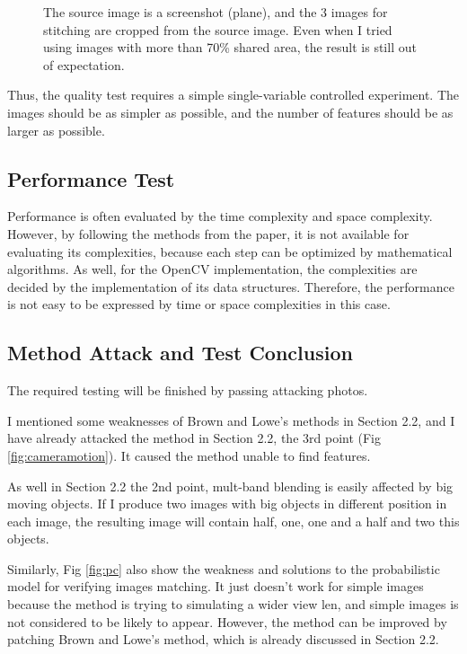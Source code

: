 \documentclass[10pt,twocolumn,letterpaper]{article}
\begin{document}
\begin{figure}[t]
\begin{center}
    \end{center}
    \caption{The source image is a screenshot (plane), and the 3 images for stitching are cropped from the source image.
    Even when I tried using images with more than 70\% shared area, the result is still out of expectation.}
    \label{fig:fail}
\end{figure}

Thus, the quality test requires a simple single-variable controlled experiment.
The images should be as simpler as possible, and the number of features should be as larger as possible.

\subsection{Performance Test}
Performance is often evaluated by the time complexity and space complexity.
However, by following the methods from the paper, it is not available for evaluating its complexities,
because each step can be optimized by mathematical algorithms. 
As well, for the OpenCV implementation, the complexities are decided by the implementation of its data structures.
Therefore, the performance is not easy to be expressed by time or space complexities in this case.

\subsection{Method Attack and Test Conclusion}
The required testing will be finished by passing attacking photos.

I mentioned some weaknesses of Brown and Lowe's methods in Section 2.2,
and I have already attacked the method in Section 2.2, the 3rd point (Fig \ref{fig:cameramotion}).
It caused the method unable to find features.

As well in Section 2.2 the 2nd point, mult-band blending is easily affected by big moving objects.
If I produce two images with big objects in different position in each image, the resulting image will contain half, one, one and a half and two this objects.

Similarly, Fig \ref{fig:pc} also show the weakness and solutions to the probabilistic model for verifying images matching.
It just doesn't work for simple images because the method is trying to simulating a wider view len, and simple images is not considered to be likely to appear.
However, the method can be improved by patching Brown and Lowe's method, which is already discussed in Section 2.2.
\end{document}
